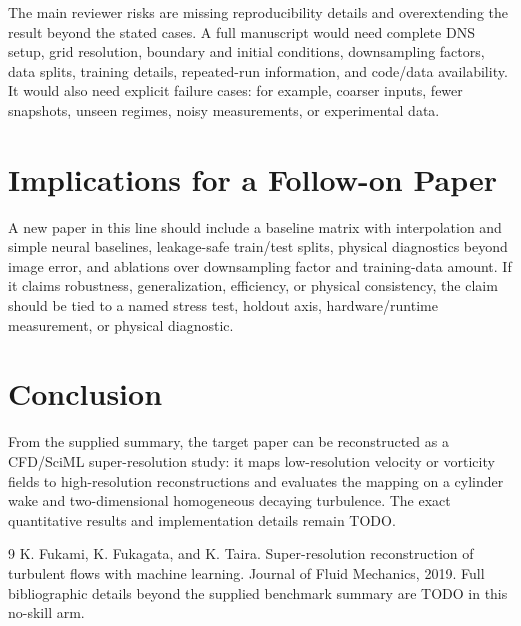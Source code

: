 \documentclass[11pt]{article}
\begin{document}
The main reviewer risks are missing reproducibility details and overextending the result beyond the stated cases. A full manuscript would need complete DNS setup, grid resolution, boundary and initial conditions, downsampling factors, data splits, training details, repeated-run information, and code/data availability. It would also need explicit failure cases: for example, coarser inputs, fewer snapshots, unseen regimes, noisy measurements, or experimental data.

\section{Implications for a Follow-on Paper}
A new paper in this line should include a baseline matrix with interpolation and simple neural baselines, leakage-safe train/test splits, physical diagnostics beyond image error, and ablations over downsampling factor and training-data amount. If it claims robustness, generalization, efficiency, or physical consistency, the claim should be tied to a named stress test, holdout axis, hardware/runtime measurement, or physical diagnostic.

\section{Conclusion}
From the supplied summary, the target paper can be reconstructed as a CFD/SciML super-resolution study: it maps low-resolution velocity or vorticity fields to high-resolution reconstructions and evaluates the mapping on a cylinder wake and two-dimensional homogeneous decaying turbulence. The exact quantitative results and implementation details remain TODO.

\begin{thebibliography}{9}
K. Fukami, K. Fukagata, and K. Taira.
\newblock Super-resolution reconstruction of turbulent flows with machine learning.
\newblock Journal of Fluid Mechanics, 2019. Full bibliographic details beyond the supplied benchmark summary are TODO in this no-skill arm.
\end{thebibliography}
\end{document}

